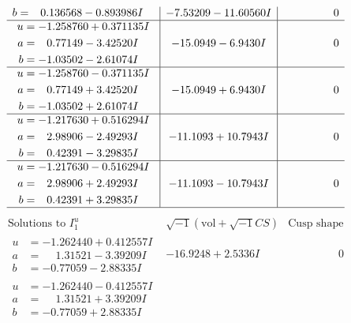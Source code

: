 \documentclass[1p]{elsarticle_modified}
\theoremstyle{definition}
\newcommand{\I}{\sqrt{-1}}
\begin{document}
$$\begin{array}{c|c|c}
\begin{aligned}
b &= \phantom{-}0.136568 - 0.893986 I\end{aligned}
 & -7.53209 - 11.60560 I & \phantom{-0.000000 } 0 \\ \hline\begin{aligned}
u &= -1.258760 + 0.371135 I \\
a &= \phantom{-}0.77149 - 3.42520 I \\
b &= -1.03502 - 2.61074 I\end{aligned}
 & -15.0949 - 6.9430 I & \phantom{-0.000000 } 0 \\ \hline\begin{aligned}
u &= -1.258760 - 0.371135 I \\
a &= \phantom{-}0.77149 + 3.42520 I \\
b &= -1.03502 + 2.61074 I\end{aligned}
 & -15.0949 + 6.9430 I & \phantom{-0.000000 } 0 \\ \hline\begin{aligned}
u &= -1.217630 + 0.516294 I \\
a &= \phantom{-}2.98906 - 2.49293 I \\
b &= \phantom{-}0.42391 - 3.29835 I\end{aligned}
 & -11.1093 + 10.7943 I & \phantom{-0.000000 } 0 \\ \hline\begin{aligned}
u &= -1.217630 - 0.516294 I \\
a &= \phantom{-}2.98906 + 2.49293 I \\
b &= \phantom{-}0.42391 + 3.29835 I\end{aligned}
 & -11.1093 - 10.7943 I & \phantom{-0.000000 } 0\\
 \hline 
 \end{array}$$\newpage$$\begin{array}{c|c|c}  
\text{Solutions to }I^u_{1}& \I (\text{vol} + \sqrt{-1}CS) & \text{Cusp shape}\\
 \hline 
\begin{aligned}
u &= -1.262440 + 0.412557 I \\
a &= \phantom{-}1.31521 - 3.39209 I \\
b &= -0.77059 - 2.88335 I\end{aligned}
 & -16.9248 + 2.5336 I & \phantom{-0.000000 } 0 \\ \hline\begin{aligned}
u &= -1.262440 - 0.412557 I \\
a &= \phantom{-}1.31521 + 3.39209 I \\
b &= -0.77059 + 2.88335 I\end{aligned}

\end{array}$$
\end{document}
